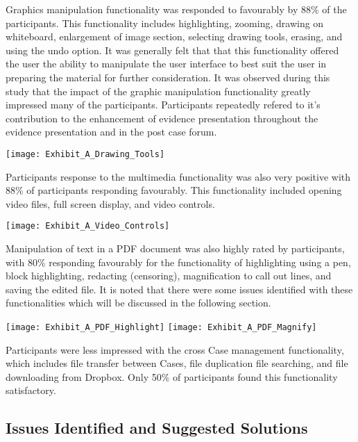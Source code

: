 


Graphics manipulation functionality was responded to favourably by 88\% of the participants. This functionality includes highlighting, zooming, drawing on whiteboard, enlargement of image section, selecting drawing tools, erasing, and using the undo option. It was generally felt that that this functionality offered the user the ability to manipulate the user interface to best suit the user in preparing the material for further consideration.
It was observed during this study that the impact of the graphic manipulation functionality greatly impressed many of the participants. Participants repeatedly refered to it's contribution to the enhancement of evidence presentation throughout the evidence presentation and in the post case forum.

\texttt{[image: Exhibit\_A\_Drawing\_Tools]}

Participants response to the multimedia functionality was also very positive with 88\% of participants responding favourably. This functionality included opening video files, full screen display, and video controls.  

\texttt{[image: Exhibit\_A\_Video\_Controls]}

Manipulation of text in a PDF document was also highly rated by participants, with 80\% responding favourably for the functionality of highlighting using a pen, block highlighting, redacting (censoring), magnification to call out lines, and saving the edited file. It is noted that there were some issues identified with these functionalities which will be discussed in the following section.

\texttt{[image: Exhibit\_A\_PDF\_Highlight]}
\texttt{[image: Exhibit\_A\_PDF\_Magnify]}

Participants were less impressed with the cross Case management functionality, which includes file transfer between Cases, file duplication file searching, and file downloading from Dropbox. Only 50\% of participants found this functionality satisfactory.

\subsection{Issues Identified and Suggested Solutions}



